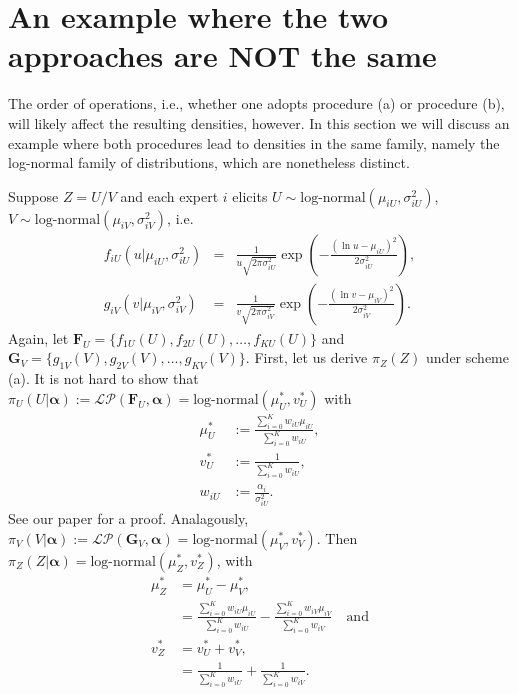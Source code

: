\documentclass[a4paper, notitlepage, 10pt]{article}
\begin{document}
\newpage
\section*{An example where the two approaches are \textbf{NOT} the same}

The order of operations, i.e., whether one adopts procedure (a) or procedure (b), will likely affect the resulting densities, however.
In this section we will discuss an example where both procedures lead to densities in the same family, namely the log-normal family of distributions, which are nonetheless distinct.

Suppose $Z = U/V$ and each expert $i$ elicits $U \sim \text{log-normal}(\mu_{iU}, \sigma_{iU}^2)$, $V \sim \text{log-normal}(\mu_{iV}, \sigma_{iV}^2)$, i.e.
\begin{eqnarray*}
\nonumber
f_{iU}(u | \mu_{iU}, \sigma_{iU}^2) &=& \frac{1}{u \sqrt{2\pi\sigma_{iU}^2}} \exp\left( - \frac{ \left( \ln u - \mu_{iU} \right)^2 }{2 \sigma_{iU}^2} \right), \\
g_{iV}(v | \mu_{iV}, \sigma_{iV}^2) &=& \frac{1}{v \sqrt{2\pi\sigma_{iV}^2}} \exp\left( - \frac{ \left( \ln v - \mu_{iV} \right)^2 }{2 \sigma_{iV}^2} \right).
\end{eqnarray*}
Again, let $\mathbf{F}_U = \{f_{1U}(U), f_{2U}(U), \ldots, f_{KU}(U) \}$ and $\mathbf{G}_V = \{g_{1V}(V), g_{2V}(V), \ldots, g_{KV}(V) \}$.
First, let us derive $\pi_Z(Z)$ under scheme (a).
It is not hard to show that  $\pi_U(U | \boldsymbol\alpha) := \mathcal{LP}(\mathbf{F}_{U}, \boldsymbol \alpha) =  \text{log-normal}(\mu_U^\ast, v_U^\ast)$ with
\begin{align}
 \mu_U^\ast &:= \frac{\sum_{i=0}^K w_{iU} \mu_{iU}}{\sum_{i=0}^K w_{iU}}, \\
 v_U^\ast &:= \frac{1}{\sum_{i=0}^K w_{iU} }, \\
 w_{iU} &:=  \frac{\alpha_i}{\sigma_{iU}^2}.
\end{align}
See our paper for a proof.
Analagously, $\pi_V(V | \boldsymbol\alpha) := \mathcal{LP}(\mathbf{G}_{V}, \boldsymbol \alpha) =  \text{log-normal}(\mu_V^\ast, v_V^\ast)$.
Then $\pi_Z(Z |  \boldsymbol \alpha) = \text{log-normal}(\mu_Z^{\ast}, v_Z^{\ast})$, with
\begin{align}
\nonumber
 \mu_Z^{\ast} &= \mu_U^\ast - \mu_V^\ast,\\
 &= \frac{\sum_{i=0}^K w_{iU} \mu_{iU}}{\sum_{i=0}^K w_{iU}} - \frac{\sum_{i=0}^K w_{iV} \mu_{iV}}{\sum_{i=0}^K w_{iV}}\quad \text{and} \\
 \nonumber
v_Z^{\ast} &= v_U^\ast + v_V^\ast, \\
&= \frac{1}{\sum_{i=0}^K w_{iU} } + \frac{1}{\sum_{i=0}^K w_{iV} }.
\end{align}
\end{document}

